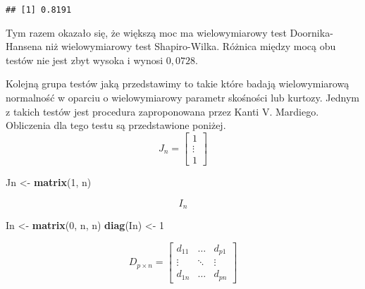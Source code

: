 \documentclass[polish,]{book}
\newenvironment{Shaded}{\begin{snugshade}}{\end{snugshade}}
\newcommand{\DecValTok}[1]{\textcolor[rgb]{0.00,0.00,0.81}{#1}}
\newcommand{\KeywordTok}[1]{\textcolor[rgb]{0.13,0.29,0.53}{\textbf{#1}}}
\newcommand{\NormalTok}[1]{#1}
\newcommand{\OperatorTok}[1]{\textcolor[rgb]{0.81,0.36,0.00}{\textbf{#1}}}
\newcommand{\StringTok}[1]{\textcolor[rgb]{0.31,0.60,0.02}{#1}}
\begin{document}
\begin{verbatim}
## [1] 0.8191
\end{verbatim}

Tym razem okazało się, że większą moc ma wielowymiarowy test Doornika-Hansena
niż wielowymiarowy test Shapiro-Wilka. Różnica między mocą obu testów nie jest
zbyt wysoka i wynosi \(0,0728\).

Kolejną grupa testów jaką przedstawimy to takie które badają wielowymiarową
normalność w oparciu o wielowymiarowy parametr skośności lub kurtozy. Jednym z
takich testów jest procedura zaproponowana przez Kanti V. Mardiego. Obliczenia dla tego testu są przedstawione poniżej.
\begin{equation}
J_n=\left[
\begin{array}{*{4}{c}}
1 \\
\vdots \\
1
\end{array}
\right]
\label{eq:wz1130}
\end{equation}

\begin{Shaded}
\begin{Highlighting}[]
\NormalTok{Jn <-}\StringTok{ }\KeywordTok{matrix}\NormalTok{(}\DecValTok{1}\NormalTok{, n)}
\end{Highlighting}
\end{Shaded}

\begin{equation}
I_n
\label{eq:wz1131}
\end{equation}

\begin{Shaded}
\begin{Highlighting}[]
\NormalTok{In <-}\StringTok{ }\KeywordTok{matrix}\NormalTok{(}\DecValTok{0}\NormalTok{, n, n)}
\KeywordTok{diag}\NormalTok{(In) <-}\StringTok{ }\DecValTok{1}
\end{Highlighting}
\end{Shaded}

\begin{equation}
D_{p \times n}=\left[
\begin{array}{*{4}{c}}
d_{11} & \ldots & d_{p1}\\
\vdots & \ddots & \vdots\\
d_{1n} & \ldots & d_{pn}
\end{array}
\right]
\label{eq:wz1132}
\end{equation}

\begin{Shaded}
\end{Shaded}
\end{document}
